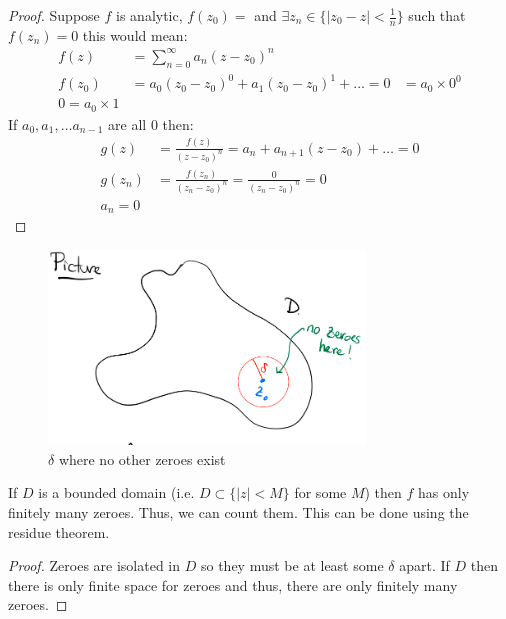 \begin{proof}
    Suppose $f$ is analytic, $f(z_0) = $ and $\exists z_n \in \{|z_0 - z| < \frac{1}n\}$ such that $f(z_n) = 0$ this would mean:
    \begin{align*}
        f(z)   & = \sum_{n=0}^{\infty} a_n(z - z_0)^n               \\
        f(z_0) & = a_0(z_0 - z_0)^0 + a_1(z_0 - z_0)^1 + \ldots = 0
               & = a_0\times 0^0                                    \\
        0 = a_0 \times 1
    \end{align*}
    If $a_0, a_1, \ldots a_{n-1}$ are all $0$ then:
    \begin{align*}
        g(z)   & = \frac{f(z)}{(z - z_0)^n} = a_n + a_{n+1}(z - z_0) + \ldots = 0 \\
        g(z_n) & = \frac{f(z_n)}{(z_n - z_0)^n} = \frac{0}{(z_n - z_0)^n} = 0     \\
        a_n = 0
    \end{align*}
\end{proof}
\begin{figure}[H]
    \centering
    \includegraphics[width=0.75\textwidth]{LECTURE_13/pic.png}
    \caption{$\delta$ where no other zeroes exist}
\end{figure}

\begin{proposition}
    If $D$ is a bounded domain (i.e. $D \subset \{|z| < M\}$ for some $M$) then $f$ has only finitely many zeroes. Thus, we can count them. This can be done using the residue theorem.
\end{proposition}

\begin{proof}
    Zeroes are isolated in $D$ so they must be at least some $\delta$ apart. If $D$ then there is only finite space for zeroes and thus, there are only finitely many zeroes.
\end{proof}

